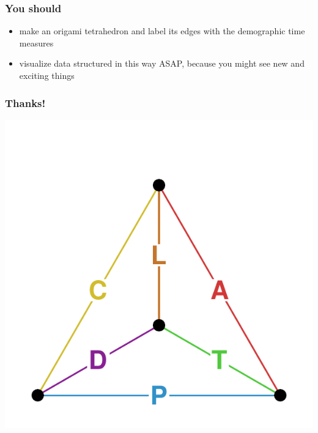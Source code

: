 \documentclass[20pt]{beamer}
\begin{document}

\begin{frame}
\frametitle{You should}
\normalsize
\begin{itemize}[<+->]
  \item make an origami tetrahedron and label its edges with the demographic
  time measures
  \item visualize data structured in this way ASAP, because you might see new
  and exciting things
\end{itemize}
\end{frame}


\begin{frame}
\frametitle{Thanks!}
\vspace{-4em}
\begin{center}
\includegraphics[scale=1.7]{Figures/TetraHedronEdgesOnly.pdf}
\end{center}
\end{frame}

\end{document}
